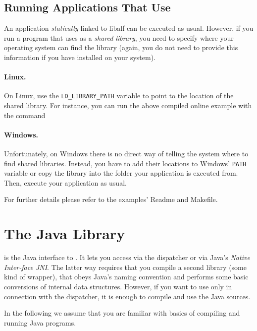 \subsection{Running Applications That Use \libalf}
An application \emph{statically} linked to libalf can be executed as usual. However, if you run a program that uses \libalf as a \emph{shared library}, you need to specify where your operating system can find the library (again, you do not need to provide this information if you have installed \libalf on your system).

\paragraph{Linux.}
On Linux, use the \texttt{LD\_LIBRARY\_PATH} variable to point to the location of the shared library. For instance, you can run the above compiled online example with the command


\paragraph{Windows.}
Unfortunately, on Windows there is no direct way of telling the system where to find shared libraries. Instead, you have to add their locations to Windows' \texttt{PATH} variable or copy the library into the folder your application is executed from. Then, execute your application as usual.

For further details please refer to the examples' Readme and Makefile.

\section{\texorpdfstring{The \jalf Java Library}{The jALF Java Library}}\label{sec:install_jalf}
\jalf is the Java interface to \libalf. It lets you access \libalf via the dispatcher or via Java's \emph{Native Inter-face JNI}. The latter way requires that you compile a second \cpp library (some kind of wrapper), that obeys Java's naming convention and performs some basic conversions of internal data structures. However, if you want to use \jalf only in connection with the dispatcher, it is enough to compile and use the Java sources.

In the following we assume that you are familiar with basics of compiling and running Java programs.

